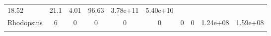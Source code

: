 \documentclass[]{article}
\begin{document}
\begin{longtable}[]{@{}lccccccccc@{}}
\begin{minipage}[t]{0.08\columnwidth}
18.52\strut
\end{minipage} & \begin{minipage}[t]{0.08\columnwidth}\centering\strut
21.1\strut
\end{minipage} & \begin{minipage}[t]{0.08\columnwidth}\centering\strut
4.01\strut
\end{minipage} & \begin{minipage}[t]{0.08\columnwidth}\centering\strut
96.63\strut
\end{minipage} & \begin{minipage}[t]{0.08\columnwidth}\centering\strut
3.78e+11\strut
\end{minipage} & \begin{minipage}[t]{0.08\columnwidth}\centering\strut
5.40e+10\strut
\end{minipage}\tabularnewline
\begin{minipage}[t]{0.07\columnwidth}\raggedright\strut
Rhodopsins\strut
\end{minipage} & \begin{minipage}[t]{0.06\columnwidth}\centering\strut
6\strut
\end{minipage} & \begin{minipage}[t]{0.08\columnwidth}\centering\strut
0\strut
\end{minipage} & \begin{minipage}[t]{0.08\columnwidth}\centering\strut
0\strut
\end{minipage} & \begin{minipage}[t]{0.08\columnwidth}\centering\strut
0\strut
\end{minipage} & \begin{minipage}[t]{0.08\columnwidth}\centering\strut
0\strut
\end{minipage} & \begin{minipage}[t]{0.08\columnwidth}\centering\strut
0\strut
\end{minipage} & \begin{minipage}[t]{0.08\columnwidth}\centering\strut
0\strut
\end{minipage} & \begin{minipage}[t]{0.08\columnwidth}\centering\strut
1.24e+08\strut
\end{minipage} & \begin{minipage}[t]{0.08\columnwidth}\centering\strut
1.59e+08\strut
\end{minipage}\tabularnewline
\begin{minipage}[t]{0.07\columnwidth}\raggedright\strut

\end{minipage}
\end{longtable}
\end{document}
